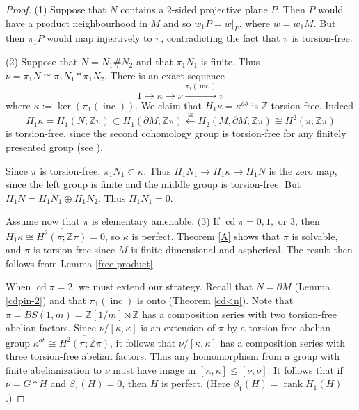 \documentclass[12pt]{amsart}
\renewcommand{\leq}{\leqslant}
\theoremstyle{definition}
\newcommand{\Z}{\mathbb Z}
\DeclareMathOperator{\cd}{cd}
\DeclareMathOperator{\inc}{inc}
\DeclareMathOperator{\rank}{rank}
\newcommand{\ol}[1]{{\overline{#1}}}
\begin{document}
\begin{proof} 
(1)
Suppose that $N$ contains a 2-sided projective plane $P$.
Then $P$ would have a product neighbourhood in $M$ and so $w_1P=w|_P$,
where $w=w_1M$.
But then $\pi_1P$ would map injectively to $\pi$, 
contradicting the fact that $\pi$ is torsion-free.

(2)
Suppose that $N = N_1 \# N_2$  and that $\pi_1N_1$ is finite.  
Thus $\nu=\pi_1N\cong\pi_1N_1 * \pi_1N_2$.  
There is an exact sequence
\begin{equation*}
1 \to \kappa \to \nu \xrightarrow{\pi_1(\inc)} \pi
\end{equation*}
where $\kappa := \ker (\pi_1(\inc))$.
We claim that $H_1\kappa = \kappa^{ab}$ is $\Z$-torsion-free.   Indeed
\begin{equation*}
H_1\kappa = H_1(N;\Z\pi) \subset H_1(\partial M; \Z\pi) \xleftarrow{\cong} H_2(M,\partial M; \Z\pi) \cong \ol{H^2(\pi;\Z\pi)}
\end{equation*}
is torsion-free, since the second cohomology group is torsion-free for any finitely presented group (see  \cite[Proposition 13.7.1]{Ge}). 

Since $\pi$ is torsion-free,  $\pi_1N_1 \subset \kappa $.
Thus $H_1N_1 \to H_1\kappa \to H_1N$ is the zero map, 
since the left group is finite and the middle group is torsion-free.   
But $H_1N = H_1N_1 \oplus H_1N_2$.   Thus $H_1N_1 = 0$.

Assume now that $\pi$ is elementary amenable.
(3)  If $\cd \pi = 0, 1,$ or $3$, then $H_1\kappa \cong  \ol{H^2(\pi;\Z\pi)} = 0$, so $\kappa$ is perfect.   Theorem \ref{A} shows that $\pi$ is solvable, and $\pi$ is torsion-free since $M$ is finite-dimensional and aspherical.   The result then follows from Lemma \ref{free product}.

When $\cd\pi=2$,  we must extend our strategy.  
Recall that $N = \partial M$ (Lemma \ref{cdpin-2}) and that $\pi_1(\inc)$ is onto (Theorem \ref{cd<n}). 
Note that $\pi = BS(1,m) = \Z[1/m] \rtimes \Z$ has a composition series with two torsion-free abelian factors.
Since $\nu/[\kappa,\kappa]$ is an extension of $\pi$ by a torsion-free abelian group  $\kappa^{ab} \cong   \ol{H^2(\pi;\Z\pi)}$, it follows that 
 $\nu/[\kappa,\kappa]$ has a composition series with three torsion-free abelian factors.
Thus any homomorphism from a group with finite abelianization to
$\nu$ must have image in $[\kappa,\kappa]\leq[\nu,\nu]$. 
It follows that if $\nu = {G*H}$ and $\beta_1(H)=0$, then $H$ is perfect.
(Here $\beta_1(H)=\rank H_1(H)$.)


\end{proof}
\end{document}
